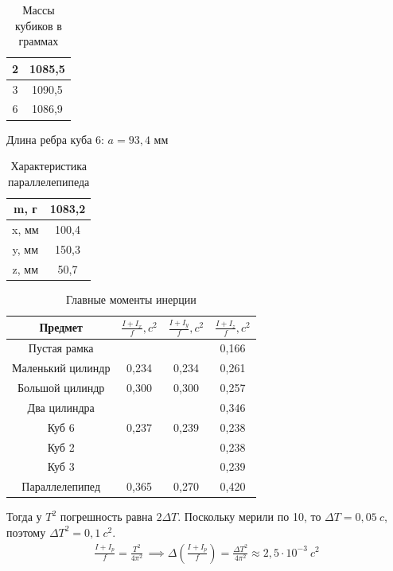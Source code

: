 \begin{table}[!h]
   \centering
   \caption{Массы кубиков в граммах}
   \begin{tabular}{|c|c|}
   \hline
       2 & 1085,5  \\ \hline
       3 & 1090,5  \\ \hline
       6 & 1086,9  \\ \hline
   \end{tabular}
\end{table}
Длина ребра куба 6: $ a = 93,4 \text{ мм } $
\begin{table}[!ht]
   \centering
   \caption{Характеристика параллелепипеда}
   \begin{tabular}{|c|c|}
   \hline
       m, г & 1083,2 \\ \hline
       x, мм & 100,4 \\ \hline
       y, мм & 150,3 \\ \hline
       z, мм & 50,7 \\ \hline
   \end{tabular}
\end{table}

 \begin{table}[!ht]
   \caption{Главные моменты инерции}
   \centering
   \begin{tabular}{|c|c|c|c|}
   \hline
       Предмет & $ \frac{I + I_x}{f}, c^2 $ & $ \frac{I + I_y}{f}, c^2 $ & $ \frac{I + I_z}{f}, c^2 $ \\ \hline
       Пустая рамка & ~ & ~ &  0,166  \\ \hline
       Маленький цилиндр &  0,234  &  0,234  &  0,261  \\ \hline
       Большой цилиндр &  0,300  &  0,300  &  0,257  \\ \hline
       Два цилиндра & ~ & ~ &  0,346  \\ \hline
       Куб 6 &  0,237  &  0,239  &  0,238  \\ \hline
       Куб 2 & ~ & ~ &  0,238  \\ \hline
       Куб 3 & ~ & ~ &  0,239  \\ \hline
       Параллелепипед &  0,365  &  0,270  &  0,420 \\ \hline
   \end{tabular}
\end{table}
\newpage

Тогда у $ T^2 $ погрешность равна $ 2\Delta T$. Поскольку мерили по 10, то $ \Delta T = 0,05~c $, поэтому $ \Delta T^2 = 0,1~c^2 $. \begin{gather}
   \frac{I + I_p}{f} = \frac{T^2}{4\pi^2}\, \implies \Delta\left(\frac{I + I_p}{f}\right) = \frac{\Delta T^2}{4\pi^2} \approx 2,5 \cdot 10^{ - 3}~c^2
\end{gather}
 

